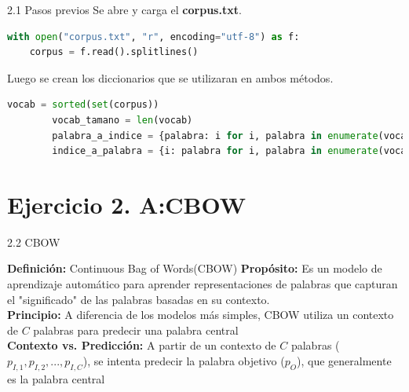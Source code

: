 \documentclass{beamer}
\begin{document}
	
\begin{frame}[fragile]{2.1 Pasos previos}
	\justifying
	Se abre y carga el \textbf{corpus.txt}.
	
	\begin{lstlisting}[language=Python]
with open("corpus.txt", "r", encoding="utf-8") as f:
	corpus = f.read().splitlines()
	\end{lstlisting}
	Luego se crean los diccionarios que se utilizaran en ambos métodos.
	\begin{lstlisting}[language=Python]
    vocab = sorted(set(corpus))
		vocab_tamano = len(vocab)
		palabra_a_indice = {palabra: i for i, palabra in enumerate(vocab)}
		indice_a_palabra = {i: palabra for i, palabra in enumerate(vocab)}
	\end{lstlisting}

\end{frame}
	
\section{Ejercicio 2. A:CBOW}
	
\begin{frame}[fragile]{2.2 CBOW}
	\begin{block}{\textbf{Definición:} Continuous Bag of Words(CBOW)}
	\justifying
	\vspace{0.1cm}
	\textbf{Propósito:} Es un modelo de aprendizaje automático para aprender representaciones de palabras que capturan el "significado" de las palabras basadas en su contexto.\\
	\vspace{0.1cm}
	\textbf{Principio:} A diferencia de los modelos más simples, CBOW utiliza un contexto de $C$ palabras para predecir una palabra central\\
	\vspace{0.1cm}
	\textbf{Contexto vs. Predicción:}  A partir de un contexto de $C$ palabras ($p_{I,1}, p_{I,2}, ..., p_{I,C}$), se intenta predecir la palabra objetivo ($p_O$), que generalmente es la palabra central
\end{block}
	
\end{frame}
	
\end{document}
